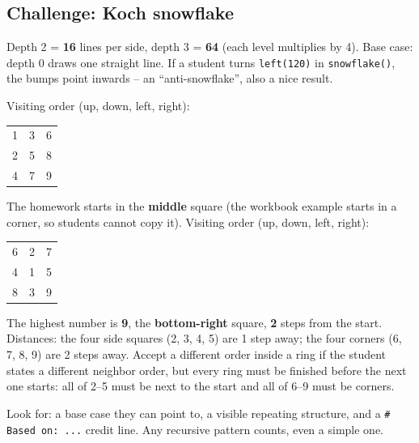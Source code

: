 \subsection{Challenge: Koch snowflake}
\begin{answer}[Challenge]
Depth 2 = \textbf{16} lines per side, depth 3 = \textbf{64} (each level multiplies by 4). Base case: depth 0 draws one straight line. If a student turns \texttt{left(120)} in \texttt{snowflake()}, the bumps point inwards -- an \enquote{anti-snowflake}, also a nice result.
\end{answer}

\begin{answer}
Visiting order (up, down, left, right):
\begin{center}
\begin{tabular}{ccc}
1 & 3 & 6\\ 2 & 5 & 8\\ 4 & 7 & 9\\
\end{tabular}
\end{center}
The homework starts in the \textbf{middle} square (the workbook example starts in a corner, so students cannot copy it). Visiting order (up, down, left, right):
\begin{center}
\begin{tabular}{ccc}
6 & 2 & 7\\ 4 & 1 & 5\\ 8 & 3 & 9\\
\end{tabular}
\end{center}
The highest number is \textbf{9}, the \textbf{bottom-right} square, \textbf{2} steps from the start. Distances: the four side squares (2, 3, 4, 5) are 1 step away; the four corners (6, 7, 8, 9) are 2 steps away. Accept a different order inside a ring if the student states a different neighbor order, but every ring must be finished before the next one starts: all of 2--5 must be next to the start and all of 6--9 must be corners.
\end{answer}

\begin{answer}
Look for: a base case they can point to, a visible repeating structure, and a \texttt{\# Based on: ...} credit line. Any recursive pattern counts, even a simple one.
\end{answer}
